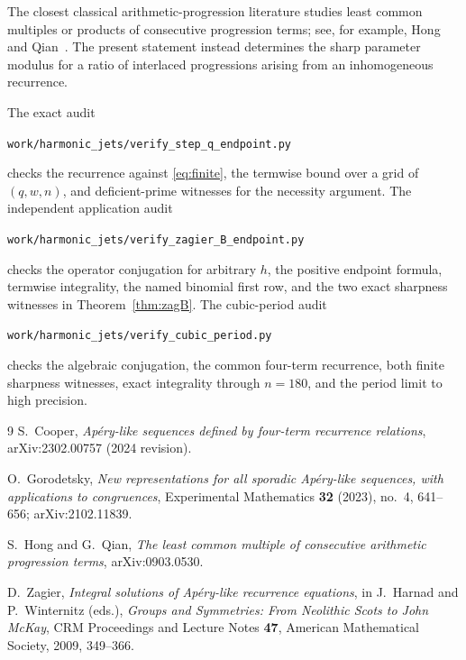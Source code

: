 \documentclass[11pt]{article}
\theoremstyle{remark}
\begin{document}
The closest classical arithmetic-progression literature studies least common
multiples or products of consecutive progression terms; see, for example,
Hong and Qian~\cite{HongQian}.  The present statement instead determines the
sharp parameter modulus for a ratio of interlaced progressions arising from
an inhomogeneous recurrence.

The exact audit
\begin{center}
\nolinkurl{work/harmonic_jets/verify_step_q_endpoint.py}
\end{center}
checks the recurrence against \eqref{eq:finite}, the termwise bound over a
grid of $(q,w,n)$, and deficient-prime witnesses for the necessity argument.
The independent application audit
\begin{center}
\nolinkurl{work/harmonic_jets/verify_zagier_B_endpoint.py}
\end{center}
checks the operator conjugation for arbitrary $h$, the positive endpoint
formula, termwise integrality, the named binomial first row, and the two exact
sharpness witnesses in Theorem~\ref{thm:zagB}.
The cubic-period audit
\begin{center}
\nolinkurl{work/harmonic_jets/verify_cubic_period.py}
\end{center}
checks the algebraic conjugation, the common four-term recurrence, both finite
sharpness witnesses, exact integrality through $n=180$, and the period limit
to high precision.

\begin{thebibliography}{9}
S.~Cooper,
\emph{Ap\'ery-like sequences defined by four-term recurrence relations},
arXiv:2302.00757 (2024 revision).

O.~Gorodetsky,
\emph{New representations for all sporadic Ap\'ery-like sequences, with applications to
congruences},
Experimental Mathematics \textbf{32} (2023), no.~4, 641--656;
arXiv:2102.11839.

S.~Hong and G.~Qian,
\emph{The least common multiple of consecutive arithmetic progression terms},
arXiv:0903.0530.

D.~Zagier,
\emph{Integral solutions of Ap\'ery-like recurrence equations},
in J.~Harnad and P.~Winternitz (eds.), \emph{Groups and Symmetries: From Neolithic Scots
to John McKay}, CRM Proceedings and Lecture Notes \textbf{47}, American Mathematical
Society, 2009, 349--366.
\end{thebibliography}
\end{document}
